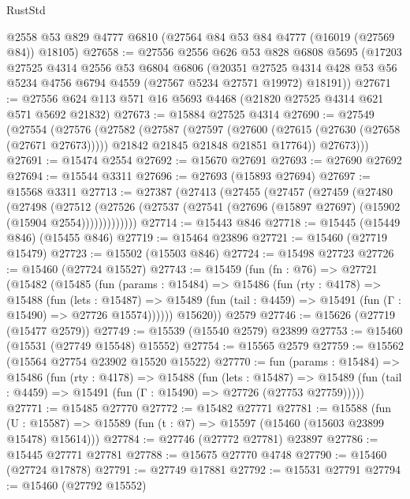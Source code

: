 \begin{lexlean}{RustStd}
\begin{coremodule}
    @2558
    @53
    @829
    @4777
    @6810
    (@27564 @84 @53 @84 @4777 (@16019 (@27569 @84)) @18105)
@27658 := @27556
    @2556
    @626
    @53
    @828
    @6808
    @5695
    (@17203
      @27525
      @4314
      @2556
      @53
      @6804
      @6806
      (@20351
        @27525
        @4314
        @428
        @53
        @56
        @5234
        @4756
        @6794
        @4559
        (@27567 @5234 @27571 @19972)
        @18191))
@27671 := @27556 @624 @113 @571 @16 @5693 @4468 (@21820 @27525 @4314 @621 @571 @5692 @21832)
@27673 := @15884 @27525 @4314
@27690 := @27549
    (@27554
      (@27576
        (@27582
          (@27587
            (@27597
              (@27600 (@27615 (@27630 (@27658 (@27671 @27673)))))
              @21842
              @21845
              @21848
              @21851
              @17764))
          @27673)))
@27691 := @15474 @2554
@27692 := @15670 @27691
@27693 := @27690 @27692
@27694 := @15544 @3311
@27696 := @27693 (@15893 @27694)
@27697 := @15568 @3311
@27713 := @27387
    (@27413
      (@27455
        (@27457
          (@27459
            (@27480
              (@27498
                (@27512
                  (@27526 (@27537 (@27541 (@27696 (@15897 @27697) (@15902 (@15904 @2554)))))))))))))
@27714 := @15443 @846
@27718 := @15445 (@15449 @846) (@15455 @846)
@27719 := @15464 @23896
@27721 := @15460 (@27719 @15479)
@27723 := @15502 (@15503 @846)
@27724 := @15498 @27723
@27726 := @15460 (@27724 @15527)
@27743 := @15459
    (fun (fn : @76) =>
    @27721
      (@15482
        (@15485
          (fun (params : @15484) =>
          @15486
            (fun (rty : @4178) =>
            @15488
              (fun (lets : @15487) =>
              @15489 (fun (tail : @4459) => @15491 (fun (Γ : @15490) => @27726 @15574))))))
        @15620))
    @2579
@27746 := @15626 (@27719 (@15477 @2579))
@27749 := @15539 (@15540 @2579) @23899
@27753 := @15460 (@15531 (@27749 @15548) @15552)
@27754 := @15565 @2579
@27759 := @15562 (@15564 @27754 @23902 @15520 @15522)
@27770 := fun (params : @15484) =>
  @15486
    (fun (rty : @4178) =>
    @15488
      (fun (lets : @15487) =>
      @15489 (fun (tail : @4459) => @15491 (fun (Γ : @15490) => @27726 (@27753 @27759)))))
@27771 := @15485 @27770
@27772 := @15482 @27771
@27781 := @15588
    (fun (U : @15587) => @15589 (fun (t : @7) => @15597 (@15460 (@15603 @23899 @15478) @15614)))
@27784 := @27746 (@27772 @27781) @23897
@27786 := @15445 @27771 @27781
@27788 := @15675 @27770 @4748
@27790 := @15460 (@27724 @17878)
@27791 := @27749 @17881
@27792 := @15531 @27791
@27794 := @15460 (@27792 @15552)

\end{coremodule}
\end{lexlean}
